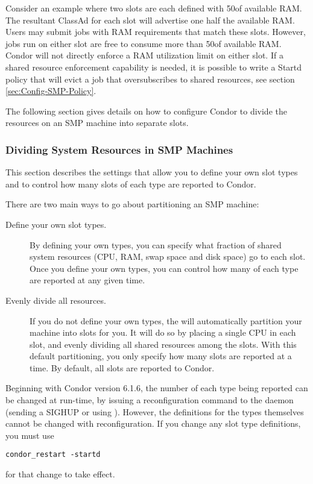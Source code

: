 Consider an example where two slots are each defined with 50\Percent of
available RAM.  The resultant ClassAd for each slot will advertise one
half the available RAM.  Users may submit jobs with RAM requirements
that match these slots.  However, jobs run on either slot are free to
consume more than 50\Percent of available RAM.  Condor will not
directly enforce a RAM utilization limit on either slot.  If a shared
resource enforcement capability is needed, it is possible to write a
Startd policy that will evict a job that oversubscribes to shared
resources, see section \ref{sec:Config-SMP-Policy}.

The following section gives details on how to configure Condor to
divide the resources on an SMP machine into separate slots.

\subsubsection{\label{sec:SMP-Divide}
Dividing System Resources in SMP Machines}

This section describes the settings that allow you to define your own
slot types and to control how many slots of each
type are reported to Condor.

There are two main ways to go about partitioning an SMP machine:

\begin{description}

\item[Define your own slot types.]
  By defining your own types, you can specify what fraction of shared
  system resources (CPU, RAM, swap space and disk space) go to each
  slot.
  Once you define your own types, you can control how many of each
  type are reported at any given time.

\item[Evenly divide all resources.]  
  If you do not define your own types, the  will
  automatically	partition your machine into slots for you.
  It will do so by placing a single CPU in each slot, and evenly dividing
  all shared resources among the slots.
  With this default partitioning, you only specify how many
  slots are reported at a time.
  By default, all slots are reported to Condor.

\end{description}

Beginning with Condor version 6.1.6, the number of each type being
reported can be changed at run-time, by issuing a reconfiguration
command to
the  daemon (sending a SIGHUP or using ).
However, the definitions for the types themselves cannot be changed
with reconfiguration.
If you change any slot type definitions, you must use 
\begin{verbatim}
condor_restart -startd
\end{verbatim}
for that change to take effect.

